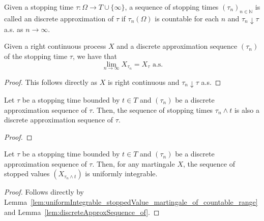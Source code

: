 \begin{definition}\label{def:approxSeq}
  \leanok
  Given a stopping time \(\tau : \Omega \to T \cup \{\infty\}\), a sequence of stopping times \((\tau_n)_{n \in \mathbb{N}}\) is called an
  discrete approximation of \(\tau\) if \(\tau_n(\Omega)\) is countable for each \(n\) and \(\tau_n \downarrow \tau\) a.s. as \(n \to \infty\).
\end{definition}

\begin{lemma}\label{lem:tendsto_stoppedValue_discreteApproxSequence}
  \leanok
  Given a right continuous process \(X\) and a discrete approximation sequence \((\tau_n)\) of the stopping time \(\tau\), we have that
  \[\lim_{n \to \infty} X_{\tau_n} = X_\tau \text{ a.s.}\]
\end{lemma}

\begin{proof}
  This follows directly as \(X\) is right continuous and \(\tau_n \downarrow \tau\) a.s.
\end{proof}

\begin{lemma}\label{lem:discreteApproxSequence_of}
  \leanok
  Let \(\tau\) be a stopping time bounded by \(t \in T\) and \((\tau_n)\) be a discrete approximation sequence of \(\tau\).
  Then, the sequence of stopping times \(\tau_n \wedge t\) is also a discrete approximation sequence of \(\tau\).
\end{lemma}

\begin{proof}
  \leanok
\end{proof}

\begin{lemma}\label{lem:uniformIntegrable_stoppedValue_discreteApproxSequence}
  \leanok
  Let \(\tau\) be a stopping time bounded by \(t \in T\) and \((\tau_n)\) be a discrete approximation sequence of \(\tau\).
  Then, for any martingale \(X\), the sequence of stopped values \((X_{\tau_n \wedge t})\) is uniformly integrable.
\end{lemma}

\begin{proof}
  \leanok
  Follows directly by Lemma~\ref{lem:uniformIntegrable_stoppedValue_martingale_of_countable_range} and Lemma~\ref{lem:discreteApproxSequence_of}.
\end{proof}

